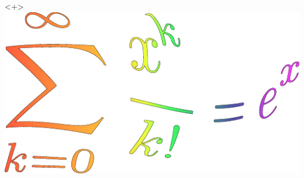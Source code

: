 \begin{frame}
\begin{onlyenv}
    \end{onlyenv}
    \begin{onlyenv}<+>
        \includegraphics[width=\textwidth,height=0.8\textheight,keepaspectratio]{assets/formulaArt.pdf}
    \end{onlyenv}
\end{frame}
\fi
